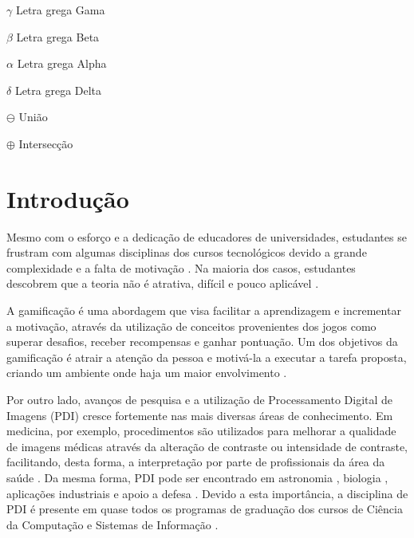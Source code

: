 \documentclass[
	12pt,				%
	oneside,			%
	a4paper,			%
	english,			%
	french,				%
	spanish,			%
	brazil,				%
	]{abntex2}
\begin{document}
\begin{simbolos}
  \item[$ \gamma $] Letra grega Gama
  \item[$ \beta $] Letra grega Beta
  \item[$ \alpha $] Letra grega Alpha
  \item[$ \delta $] Letra grega Delta
  \item[$ \ominus $] União
  \item[$ \oplus $] Intersecção
  
\end{simbolos}

\tableofcontents*
\cleardoublepage


\textual

\chapter{Introdução}

Mesmo com o esforço e a dedicação de educadores de universidades, estudantes se frustram com algumas disciplinas dos cursos tecnológicos devido a grande complexidade e a falta de motivação \cite{garcia2015colfdimap}. Na maioria dos casos, estudantes descobrem que a teoria não é atrativa, difícil e pouco aplicável \cite{zin2015transforming}.

A gamificação é uma abordagem que visa facilitar a aprendizagem e incrementar a motivação, através da utilização de conceitos provenientes dos jogos como superar desafios, receber recompensas e ganhar pontuação. Um dos objetivos da gamificação é atrair a atenção da pessoa e motivá-la a executar a tarefa proposta, criando um ambiente onde haja um maior envolvimento \cite{kaap:2014}.   

Por outro lado, avanços de pesquisa e a  utilização de Processamento Digital de Imagens (PDI) cresce fortemente nas mais diversas áreas de conhecimento. Em medicina, por exemplo, procedimentos são utilizados para melhorar a qualidade de imagens médicas através da alteração de contraste ou intensidade de contraste, facilitando, desta forma, a interpretação por parte de profissionais da área da saúde \cite{ronnau2015}. Da mesma forma, PDI pode ser encontrado em astronomia \cite{grice20153d}, biologia \cite{hardy2017advanced}, aplicações industriais \cite{dai2015advances} e apoio a defesa \cite{mendoza2016development}. Devido a esta importância, a disciplina de PDI é presente em quase todos os programas de graduação dos cursos de Ciência da Computação e Sistemas de Informação \cite{garcia2015colfdimap}.
\end{document}

